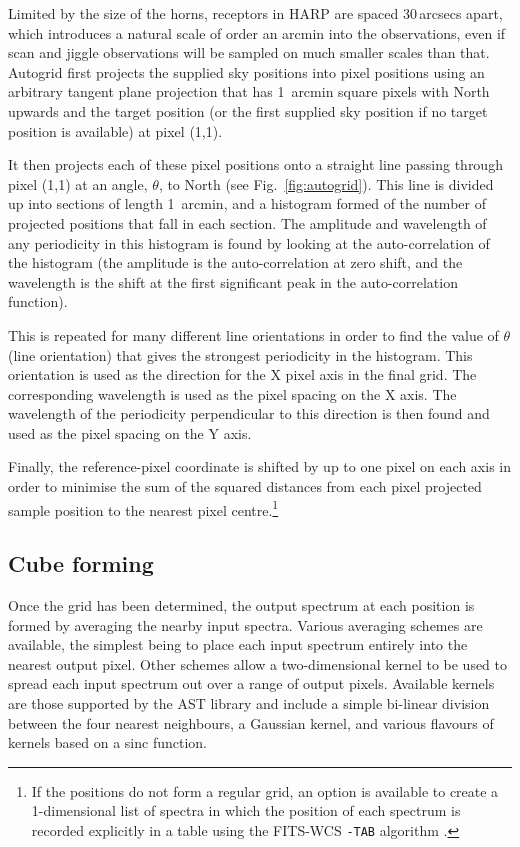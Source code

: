 \documentclass[final,authoryear,5p,times,twocolumn]{elsarticle}
\begin{document}
Limited by the size of the horns, receptors in HARP are spaced
30\,arcsecs apart, which introduces a natural scale of order an arcmin
into the observations, even if scan and jiggle observations will be
sampled on much smaller scales than that. Autogrid first projects the
supplied sky positions into pixel positions using an arbitrary tangent
plane projection that has 1~arcmin square pixels with North upwards
and the target position (or the first supplied sky position if no
target position is available) at pixel (1,1).

It then projects each of these pixel positions onto a straight line
passing through pixel (1,1) at an angle, $\theta$, to North (see
Fig.~\ref{fig:autogrid}). This line is divided up into sections of
length 1~arcmin, and a histogram formed of the number of projected
positions that fall in each section. The amplitude and wavelength of
any periodicity in this histogram is found by looking at the
auto-correlation of the histogram (the amplitude is the
auto-correlation at zero shift, and the wavelength is the shift at the
first significant peak in the auto-correlation function).

This is repeated for many different line orientations in order to find
the value of $\theta$ (line orientation) that gives the strongest
periodicity in the histogram. This orientation is used as the
direction for the X pixel axis in the final grid. The corresponding
wavelength is used as the pixel spacing on the X axis. The wavelength
of the periodicity perpendicular to this direction is then found and
used as the pixel spacing on the Y axis.

Finally, the reference-pixel coordinate is shifted by up to one pixel
on each axis in order to minimise the sum of the squared distances
from each pixel projected sample position to the nearest pixel
centre.\footnote{If the positions do not form a regular grid, an option is
available to create a 1-dimensional list of spectra in which the
position of each spectrum is recorded explicitly in a table using
the FITS-WCS \texttt{-TAB} algorithm \citep{2006A&A...446..747G}.}

\subsection{Cube forming}

Once the grid has been determined, the output spectrum at each
position is formed by averaging the nearby input spectra. Various
averaging schemes are available, the simplest being to place each
input spectrum entirely into the nearest output pixel. Other schemes
allow a two-dimensional kernel to be used to spread each input spectrum
out over a range of output pixels. Available kernels are those
supported by the AST library \citep{SUN211,2012ASPC..461..825B} and
include a simple bi-linear division between the four nearest
neighbours, a Gaussian kernel, and various flavours of kernels based
on a sinc function.
\end{document}
